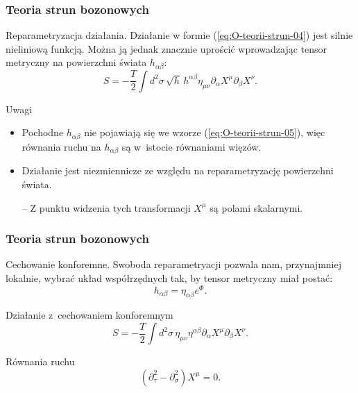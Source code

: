 \documentclass[10pt,t]{beamer}
\begin{document}
\begin{frame}
  \frametitle{Teoria strun bozonowych}


  Reparametryzacja działania. Działanie w formie
  (\ref{eq:O-teorii-strun-04}) jest silnie nieliniową funkcją.
  Można ją jednak znacznie uprościć wprowadzając tensor metryczny na
  powierzchni świata $h_{ \alpha \beta }$:
  \begin{equation}
    \label{eq:O-teorii-strun-05}
    S =
    -\frac{ T }{ 2 } \int d^{ 2 }\sigma \, \sqrt{ h } \, h^{ \alpha \beta } \eta_{ \mu \nu }
    \partial_{ \alpha } X^{ \mu } \partial_{ \beta } X^{ \nu }.
  \end{equation}

  Uwagi
  \begin{itemize}

  \item Pochodne $h_{ \alpha \beta }$ nie pojawiają się we wzorze
    (\ref{eq:O-teorii-strun-05}), więc równania ruchu na $h_{ \alpha \beta }$ są
    w~istocie równaniami więzów.

  \item Działanie jest niezmiennicze ze względu na reparametryzację
    powierzchni świata.

  \item[--] Z punktu widzenia tych transformacji $X^{ \mu }$ są polami
    skalarnymi.

  \end{itemize}

\end{frame}





\begin{frame}
  \frametitle{Teoria strun bozonowych}


  Cechowanie konforemne. Swoboda reparametryacji pozwala nam, przynajmniej
  lokalnie, wybrać układ współrzędnych tak, by tensor metryczny miał postać:
  \begin{equation}
    \label{eq:O-teorii-strun-06}
    h_{ \alpha \beta } = \eta_{ \alpha \beta } e^{ \Phi }.
  \end{equation}

  Działanie z~cechowaniem konforemnym
  \begin{equation}
    \label{eq:O-teorii-strun-07}
    S =
    -\frac{ T }{ 2 } \int d^{ 2 } \sigma \, \eta_{ \mu \nu } \eta^{ \alpha \beta } \partial_{ \alpha } X^{ \mu }
    \partial_{ \beta } X^{ \nu }.
  \end{equation}

  Równania ruchu
  \begin{equation}
    \label{eq:O-teorii-strun-07}
    ( \partial_{ \tau }^{ 2 } - \partial_{ \sigma }^{ 2 } ) X^{ \mu } = 0.
  \end{equation}

\end{frame}
\end{document}
